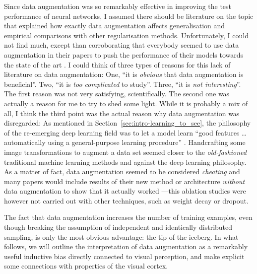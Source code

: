 {Since data augmentation was so remarkably effective in improving the test performance of neural networks, I assumed there should be literature on the topic that explained how exactly data augmentation affects generalisation and empirical comparisons with other regularisation methods. Unfortunately, I could not find much, except than corroborating that everybody seemed to use data augmentation in their papers to push the performance of their models towards the state of the art \citep{krizhevsky2012alexnet, springenberg2014allcnn}. I could think of three types of reasons for this lack of literature on data augmentation: One, ``it is \textit{obvious} that data augmentation is beneficial''. Two, ``it is \textit{too complicated} to study''. Three, ``it is \textit{not interesting}''. The first reason was not very satisfying, scientifically. The second one was actually a reason for me to try to shed some light. While it is probably a mix of all, I think the third point was the actual reason why data augmentation was disregarded: As mentioned in Section~\ref{sec:intro-learning_to_see}, the philosophy of the re-emerging deep learning field was to let a model learn ``good features \dots automatically using a general-purpose learning procedure'' \citep{lecun2015deeplearningnature}. Handcrafting some image transformations to augment a data set seemed closer to the \textit{old-fashioned} traditional machine learning methods and against the deep learning philosophy. As a matter of fact, data augmentation seemed to be considered \textit{cheating} and many papers would include results of their new method or architecture \textit{without} data augmentation to show that it actually worked \citep{goodfellow2013maxout, graham2014fracmaxpool, larsson2016fractalnet}---this ablation studies were however not carried out with other techniques, such as weight decay or dropout. 

The fact that data augmentation increases the number of training examples, even though breaking the assumption of independent and identically distributed sampling, is only the most obvious advantage: the tip of the iceberg. In what follows, we will outline the interpretation of data augmentation as a remarkably useful inductive bias directly connected to visual perception, and make explicit some connections with properties of the visual cortex.

}

